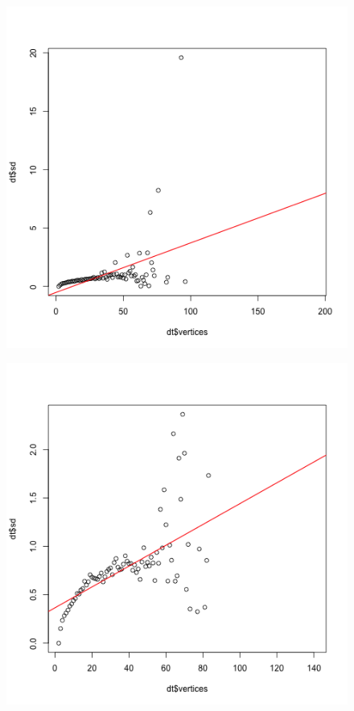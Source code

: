 \documentclass[paper=a4, fontsize=11pt]{scrartcl} %
\begin{document}
\begin{figure}
\centering
\begin{minipage}{.5\textwidth}
  \centering
  \includegraphics[width=\linewidth]{homoscedasticity_Czech.png}
  \label{fig:15}
\end{minipage}%
\begin{minipage}{.5\textwidth}
  \centering
  \includegraphics[width=\linewidth]{homoscedasticity_English.png}
  \label{fig:16}
\end{minipage}
\end{figure}
\end{document}

